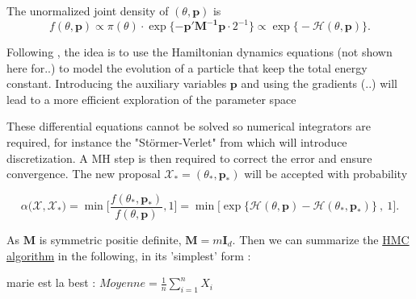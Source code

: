 The unormalized joint density of $(\theta,\boldsymbol{p})$ is 
\begin{equation}
f(\theta,\boldsymbol{p})\propto \pi(\theta)\cdot\exp\{-\boldsymbol{p'M^{-1}p}\cdot 2^{-1}\}\propto\exp\big\{-\mathcal{H}(\theta,\boldsymbol{p})\big\}.
\end{equation}


Following \cite{hartmann_bayesian_2016}, the idea is to use the Hamiltonian dynamics equations (not shown here for..) to model the evolution of a particle that keep the total energy constant.
Introducing the auxiliary variables $\boldsymbol{p}$ and using the gradients (..) will lead to a more efficient exploration of the parameter space 



These differential equations cannot be solved so numerical integrators are required, for instance the "Störmer-Verlet" from \cite{leimkulher_..._2004} which will introduce discretization. A MH step is then required to correct the error and ensure convergence.  The new proposal $\mathcal{X}_*=(\theta_*,\boldsymbol{p}_*)$ will be accepted with probability 

\begin{equation}
\alpha\big(\mathcal{X},\mathcal{X}_*\big)=\min\Bigg[\frac{f(\theta_*,\boldsymbol{p}_*)}{f(\theta,\boldsymbol{p})},1\Bigg]=\min\Big[\exp\big\{\mathcal{H}(\theta,\boldsymbol{p})-\mathcal{H}(\theta_*,\boldsymbol{p}_*)\big\}\ ,\ 1\Big].
\end{equation}

As $\boldsymbol{M}$ is symmetric positie definite, $\boldsymbol{M}=m\boldsymbol{I}_d$. 
Then we can summarize the \hyperref[algo_hmc]{HMC algorithm} in the following, in its 'simplest' form :

marie est la best : $Moyenne=\frac{1}{n}\sum_{i=1}^{n}X_i$


